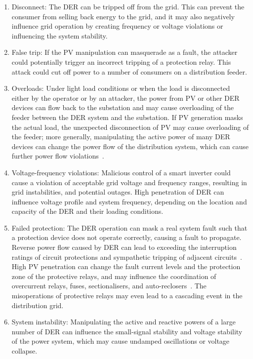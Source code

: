 \documentclass[conference]{IEEEtran}
\begin{document}
\begin{enumerate}
\item Disconnect: The DER can be tripped off from the grid. This can
prevent the consumer from selling back energy to the grid, and it
may also negatively influence grid operation by creating frequency
or voltage violations or influencing the system stability.

\item  False trip: If the PV manipulation can masquerade as a fault, the
attacker could potentially trigger an incorrect tripping of a protection
relay. This attack could cut off power to a number of consumers on a
distribution feeder.

\item  Overloads: Under light load conditions or when the load is
disconnected either by the operator or by an attacker, the power from PV or other DER devices can flow back to the substation and
may cause overloading of the feeder between the DER system and
the substation. If PV generation masks the actual load, the
unexpected disconnection of PV may cause overloading of the
feeder; more generally, manipulating the active power of many
DER devices can change the power flow of the distribution
system, which can cause further power flow violations~\cite{Solar}.

\item Voltage-frequency violations: Malicious control of a smart
inverter could cause a violation of acceptable grid voltage and
frequency ranges, resulting in grid instabilities, and potential
outages. High penetration of DER can influence voltage profile
and system frequency, depending on the location and capacity of
the DER and their loading conditions.

\item Failed protection: The DER operation can mask a real system
fault such that a protection device does not operate correctly,
causing a fault to propagate. Reverse power flow caused by DER
can lead to exceeding the interruption ratings of circuit protections
and sympathetic tripping of adjacent circuits~\cite{Solar}. High PV
penetration can change the fault current levels and the protection
zone of the protective relays, and may influence the coordination
of overcurrent relays, fuses, sectionalisers, and auto-reclosers~\cite{Solar}.
The misoperations of protective relays may even lead to a
cascading event in the distribution grid.

\item System instability: Manipulating the active and reactive powers of
a large number of DER can influence the small-signal stability and
voltage stability of the power system, which may cause undamped
oscillations or voltage collapse.

\end{enumerate}
\end{document}
